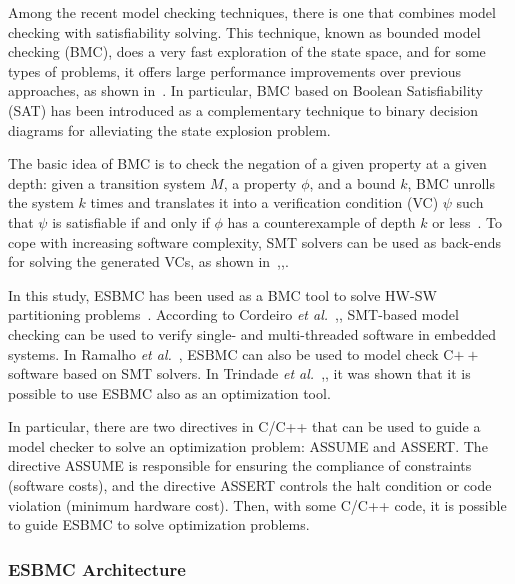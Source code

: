 Among the recent model checking techniques, there is one that combines model checking with satisﬁability solving. This technique, known as bounded model checking (BMC), does a very fast exploration of the state space, and for some types of problems, it offers large performance improvements over previous approaches, as shown in~\cite{Biere2009}. In particular, BMC based on Boolean Satisfiability (SAT) has been introduced as a complementary technique to binary decision diagrams for alleviating the state explosion problem. 

The basic idea of BMC is to check the negation of a given property at a given depth: given a transition system $M$, a property $\phi$, and a bound $k$, BMC unrolls the system $k$ times and translates it into a verification condition (VC) $\psi$  such that $\psi$ is satisfiable if and only if $\phi$ has a counterexample of depth $k$ or less~\cite{Biere2009}. To cope with increasing software complexity, SMT solvers can be used as back-ends for solving the generated VCs, as shown in~\cite{Armando2009},\cite{Ganai2006},\cite{Cordeiro2012}. 

In this study, ESBMC has been used as a BMC tool to solve HW-SW partitioning problems~\cite{Cordeiro2012}. According to Cordeiro {\it et al.}~\cite{Cordeiro2012},\cite{Cordeiro2011}, SMT-based model checking can be used to verify single- and multi-threaded software in embedded systems. In Ramalho {\it et al.}~\cite{Ramalho2013}, ESBMC can also be used to model check C$++$ software based on SMT solvers. In Trindade {\it et al.}~\cite{Trindade2015},\cite{Trindade2014}, it was shown that it is possible to use ESBMC also as an optimization tool.

In particular, there are two directives in C/C++ that can be used to guide a model checker to solve an optimization problem: ASSUME and ASSERT. The directive ASSUME is responsible for ensuring the compliance of constraints (software costs), and the directive ASSERT controls the halt condition or code violation (minimum hardware cost). Then, with some C/C++ code, it is possible to guide ESBMC to solve optimization problems.

\subsubsection{ESBMC Architecture}
\label{ESBMCArchitecture}

